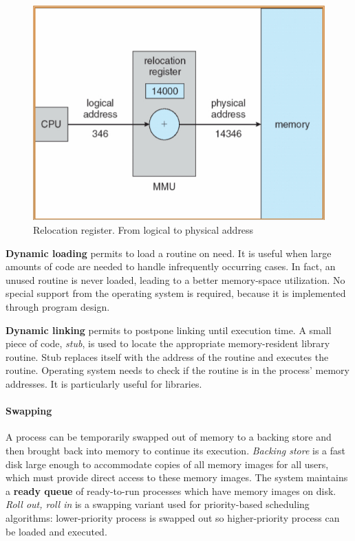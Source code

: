 \begin{figure}[hbtp]
\centering
\includegraphics[scale=0.35]{images/memory_management/relocation_register.jpg}
\caption{Relocation register. From logical to physical address}
\end{figure}

\textbf{Dynamic loading} permits to load a routine on need. It is useful when large amounts of code are needed to handle infrequently occurring cases. In fact, an unused routine is never loaded, leading to a better memory-space utilization. No special support from the operating system is required, because it is implemented through program design.

\textbf{Dynamic linking} permits to postpone linking until execution time. A small piece of code, \emph{stub}, is used to locate the appropriate memory-resident library routine. Stub replaces itself with the address of the routine and executes the routine. Operating system needs to check if the routine is in the process' memory addresses. It is particularly useful for libraries.

\paragraph{Swapping}
A process can be temporarily swapped out of memory to a backing store and then brought back into memory to continue its execution. \emph{Backing store} is a fast disk large enough to accommodate copies of all memory images for all users, which must provide direct access to these memory images. The system maintains a \textbf{ready queue} of ready-to-run processes which have memory images on disk. \emph{Roll out, roll in} is a swapping variant used for priority-based scheduling algorithms: lower-priority process is swapped out so higher-priority process can be loaded and executed.

